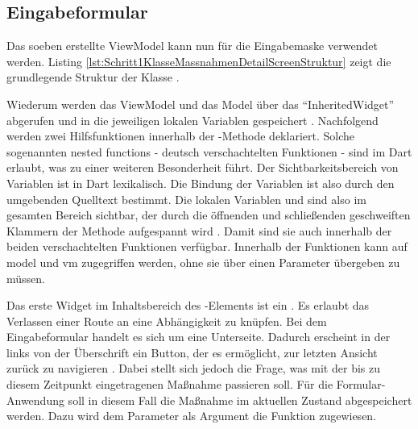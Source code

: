 
\clearpage
\subsection{Eingabeformular}
  
Das soeben erstellte ViewModel kann nun für die Eingabemaske verwendet werden.
Listing \ref{lst:Schritt1KlasseMassnahmenDetailScreenStruktur} zeigt die grundlegende Struktur der Klasse .

    
Wiederum werden das ViewModel und das Model über das \enquote{InheritedWidget}  abgerufen und in die jeweiligen lokalen Variablen gespeichert .
Nachfolgend werden zwei Hilfsfunktionen innerhalb der -Methode deklariert.
Solche sogenannten nested functions - deutsch
verschachtelten Funktionen - sind im Dart erlaubt, was zu einer weiteren Besonderheit führt.
Der Sichtbarkeitsbereich von Variablen ist in Dart lexikalisch.
Die Bindung der Variablen ist also durch den umgebenden Quelltext bestimmt.
Die lokalen Variablen  und  sind also im gesamten Bereich sichtbar, der durch die öffnenden und schließenden geschweiften Klammern der Methode  aufgespannt wird .
Damit sind sie auch innerhalb der beiden verschachtelten Funktionen verfügbar.
Innerhalb der Funktionen kann auf model und vm zugegriffen werden, ohne sie über einen Parameter übergeben zu müssen.


Das erste Widget im Inhaltsbereich des -Elements ist ein .
Es erlaubt das Verlassen einer Route an eine Abhängigkeit zu knüpfen.
Bei dem Eingabeformular handelt es sich um eine Unterseite.
Dadurch erscheint in der   links von der Überschrift ein Button, der es ermöglicht, zur letzten Ansicht zurück zu navigieren \Abb{\ref{fig:Schritt1Eingabemaske}}.
Dabei stellt sich jedoch die Frage, was mit der bis zu diesem Zeitpunkt eingetragenen Maßnahme passieren soll.
Für die Formular-Anwendung soll in diesem Fall die Maßnahme im aktuellen Zustand abgespeichert werden.
Dazu wird dem Parameter  als Argument die Funktion  zugewiesen.



